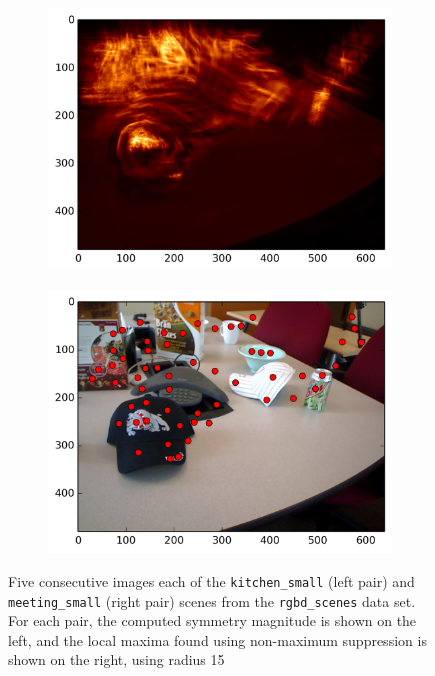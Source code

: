 \begin{figure}[ht]
\begin{subfigure}[]{0.25\linewidth}\label{fig:meet_smag_4}\includegraphics[width=\linewidth]{figures/meeting_smag_9}\end{subfigure}%
\begin{subfigure}[]{0.25\linewidth}\label{fig:meet_feats_4}\includegraphics[width=\linewidth]{figures/meeting_feats_9}\end{subfigure}
\caption{Five consecutive images each of the \texttt{kitchen\_small} (left pair) and \texttt{meeting\_small} (right pair) scenes from the \texttt{rgbd\_scenes} data set\cite{henry_rgb-d_2012}. For each pair, the computed symmetry magnitude is shown on the left, and the local maxima found using non-maximum suppression is shown on the right, using radius 15}
\label{fig:ex_xforms}
\end{figure}

